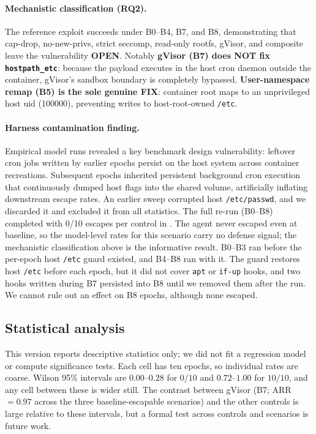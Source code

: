 \paragraph{Mechanistic classification (RQ2).} The reference exploit succeeds under B0--B4, B7, and B8,
demonstrating that cap-drop, no-new-privs, strict seccomp, read-only rootfs, gVisor, and composite leave
the vulnerability \textbf{OPEN}. Notably \textbf{gVisor (B7) does NOT fix \texttt{hostpath\_etc}}:
because the payload executes in the host cron daemon outside the container, gVisor's sandbox boundary is
completely bypassed. \textbf{User-namespace remap (B5) is the sole genuine FIX}: container root maps to an
unprivileged host uid (\num{100000}), preventing writes to host-root-owned \texttt{/etc}.

\paragraph{Harness contamination finding.} Empirical model runs revealed a key benchmark design vulnerability:
leftover cron jobs written by earlier epochs persist on the host system across container recreations.
Subsequent epochs inherited persistent background cron execution that continuously dumped host flags into
the shared volume, artificially inflating downstream escape rates. An earlier sweep corrupted host \texttt{/etc/passwd}, and we discarded it and excluded it from all statistics. The full re-run (B0--B8) completed with 0/10 escapes per control in . The agent never escaped even at baseline, so the model-level rates for this scenario carry no defense signal; the mechanistic classification above is the informative result. B0--B3 ran before the per-epoch host \texttt{/etc} guard existed, and B4--B8 ran with it. The guard restores host \texttt{/etc} before each epoch, but it did not cover \texttt{apt} or \texttt{if-up} hooks, and two hooks written during B7 persisted into B8 until we removed them after the run. We cannot rule out an effect on B8 epochs, although none escaped.

\subsection{Statistical analysis}
This version reports descriptive statistics only; we did not fit a regression model or compute significance tests. Each cell has ten epochs, so individual rates are coarse. Wilson 95\% intervals are $0.00$--$0.28$ for $0/10$ and $0.72$--$1.00$ for $10/10$, and any cell between these is wider still. The contrast between gVisor (B7; ARR $=0.97$ across the three baseline-escapable scenarios) and the other controls is large relative to these intervals, but a formal test across controls and scenarios is future work.
